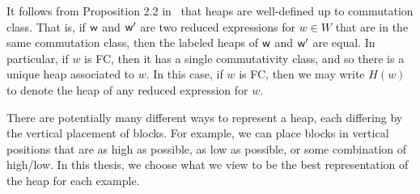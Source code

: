 \begin{remark} It follows from Proposition 2.2 in~\cite{Stembridge1996} that heaps are well-defined up to commutation class.
    That is, if $\mathsf{w}$ and $\mathsf{w}'$ are two reduced expressions for $w \in W$ that are in the same commutation class, then the labeled heaps of $\mathsf{w}$ and $\mathsf{w}'$ are equal.
    In particular, if $w$ is FC, then it has a single commutativity class, and so there is a unique heap associated to $w$.
    In this case, if $w$ is FC, then we may write $H(w)$ to denote the heap of any reduced expression for $w$.
\end{remark}

    There are potentially many different ways to represent a heap, each differing by the vertical placement of blocks. For example, we can place blocks in vertical positions that are as high as possible, as low as possible, or some combination of high/low. In this thesis, we choose what we view to be the best representation of the heap for each example.

